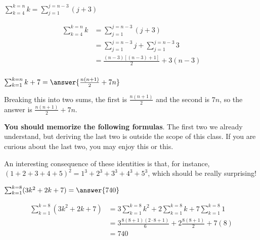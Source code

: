 \documentclass{ximera}
\begin{document}
\begin{example}
\begin{explanation}
\begin{question}
\begin{hint}
			$\sum_{k=4}^{k=n} k  =\sum_{j=1}^{j=n-3} (j+3)$
		\end{hint}
		\begin{hint}
			\begin{align*}
				\sum_{k=4}^{k=n} k  &= \sum_{j=1}^{j=n-3} (j+3)\\
				&= \sum_{j=1}^{j=n-3} j + \sum_{j=1}^{j=n-3} 3\\
				&= \frac{(n-3)[(n-3)+1]}{2} + 3(n-3)\\
			\end{align*}
		\end{hint}
\end{question}

\begin{question}
	$\sum_{k=1}^{k=n} k+7  = \answer{ \frac{n(n+1)}{2} +7n}$
	\begin{hint}
		Breaking this into two sums, the first is $\frac{n(n+1)}{2}$ and the second is $7n$, so the answer is $\frac{n(n+1)}{2} +7n$.
	\end{hint}
\end{question}

\textbf{You should memorize the following formulas}. The first two we already understand, but deriving the last two is outside the scope of this class.  If you are curious about the last two, you may enjoy this or this.


An interesting consequence of these identities is that, for instance, $(1+2+3+4+5)^2 = 1^3+2^3+3^3+4^3+5^3$, which should be really surprising!

\begin{question}
	$\sum_{k=1}^{k=8} (3k^2+2k+7) = \answer{740}$
	\begin{hint}
		\begin{align*}
			\sum_{k=1}^{k=8} (3k^2+2k+7) &= 3 \sum_{k=1}^{k=8} k^2 + 2 \sum_{k=1}^{k=8} k + 7   \sum_{k=1}^{k=8} 1\\
			&= 3 \frac{8(8+1)(2\cdot 8+1)}{6} + 2 \frac{8(8+1)}{2} + 7(8)\\
			&= 740
		\end{align*}
	\end{hint}
\end{question}


\end{explanation}
\end{example}
\end{document}
